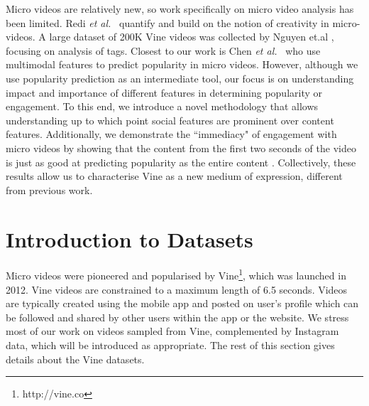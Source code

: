 Micro videos are relatively new, so work specifically on micro video analysis has been limited. Redi \textsl{et al.}~\cite{redi20146} quantify and build on the notion of creativity in micro-videos. A large dataset of 200K Vine videos was collected by Nguyen et.al \cite{nguyen2016open}, focusing on analysis of tags. Closest to our work is Chen \textsl{et al.}~\cite{Chen:2016:MTM:2964284.2964314} who use multimodal features to predict popularity in micro videos. However, although we use popularity prediction as an intermediate tool, our focus is on understanding impact and importance of different features in determining popularity or engagement. To this end, we introduce a novel methodology 
that allows understanding up to which point social features are prominent over content features. Additionally, we demonstrate the ``immediacy" of engagement with micro videos by showing that the content from the first two seconds of the video is just as good at predicting  popularity as the entire content 
. Collectively, these results allow us to characterise Vine as a new medium of expression, different from previous work.




\section{Introduction to Datasets}

Micro videos were pioneered and popularised by Vine\footnote{\scriptsize http://vine.co}, which was launched in 2012. Vine videos are constrained to a maximum length of 6.5 seconds. Videos are typically created using the mobile app and posted on user's profile which can be followed and shared by other users within the app or the website. %
We stress most of our work on videos sampled from Vine, complemented by %
Instagram data, which will be introduced as appropriate. The rest of this section gives details about the Vine datasets.





